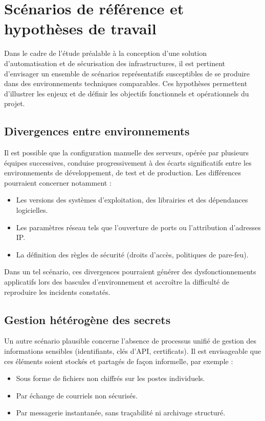 \section{Scénarios de référence et hypothèses de travail}

Dans le cadre de l'étude préalable à la conception d'une solution d'automatisation et de sécurisation des infrastructures, il est pertinent d'envisager un ensemble de scénarios représentatifs susceptibles de se produire dans des environnements techniques comparables. Ces hypothèses permettent d'illustrer les enjeux et de définir les objectifs fonctionnels et opérationnels du projet.

\subsection{Divergences entre environnements}

Il est possible que la configuration manuelle des serveurs, opérée par plusieurs équipes successives, conduise progressivement à des écarts significatifs entre les environnements de développement, de test et de production. Les différences pourraient concerner notamment :
\begin{itemize}
	\item Les versions des systèmes d'exploitation, des librairies et des dépendances logicielles.
	\item Les paramètres réseau tels que l'ouverture de ports ou l'attribution d'adresses IP.
	\item La définition des règles de sécurité (droits d'accès, politiques de pare-feu).
\end{itemize}

Dans un tel scénario, ces divergences pourraient générer des dysfonctionnements applicatifs lors des bascules d'environnement et accroître la difficulté de reproduire les incidents constatés.

\subsection{Gestion hétérogène des secrets}

Un autre scénario plausible concerne l'absence de processus unifié de gestion des informations sensibles (identifiants, clés d'API, certificats). Il est envisageable que ces éléments soient stockés et partagés de façon informelle, par exemple :
\begin{itemize}
	\item Sous forme de fichiers non chiffrés sur les postes individuels.
	\item Par échange de courriels non sécurisés.
	\item Par messagerie instantanée, sans traçabilité ni archivage structuré.
\end{itemize}

